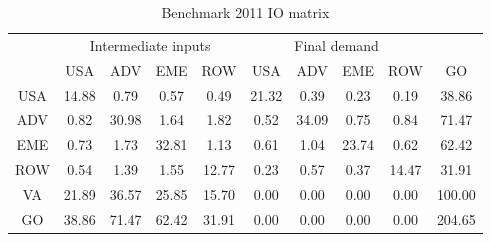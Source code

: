 \begin{table}[p]
\begin{center}
\caption{Benchmark 2011 IO matrix}
\label{tab:iomat-bench-2011}
\small
\begin{tabular}{cccccccccc}
\toprule
& \multicolumn{4}{c}{Intermediate inputs}& \multicolumn{4}{c}{Final demand} & \\
\cmidrule(rl){2-5}\cmidrule(rl){6-9}
 &USA &ADV &EME &ROW &USA &ADV &EME &ROW& GO\\
\midrule
USA& 14.88& 0.79& 0.57& 0.49& 21.32& 0.39& 0.23& 0.19& 38.86 \\
ADV& 0.82& 30.98& 1.64& 1.82& 0.52& 34.09& 0.75& 0.84& 71.47 \\
EME& 0.73& 1.73& 32.81& 1.13& 0.61& 1.04& 23.74& 0.62& 62.42 \\
ROW& 0.54& 1.39& 1.55& 12.77& 0.23& 0.57& 0.37& 14.47& 31.91 \\
\midrule
VA& 21.89& 36.57& 25.85& 15.70& 0.00& 0.00& 0.00& 0.00& 100.00\\
\midrule
GO& 38.86& 71.47& 62.42& 31.91& 0.00& 0.00& 0.00& 0.00& 204.65\\
\bottomrule
\end{tabular}
\normalsize
\end{center}
\end{table}
